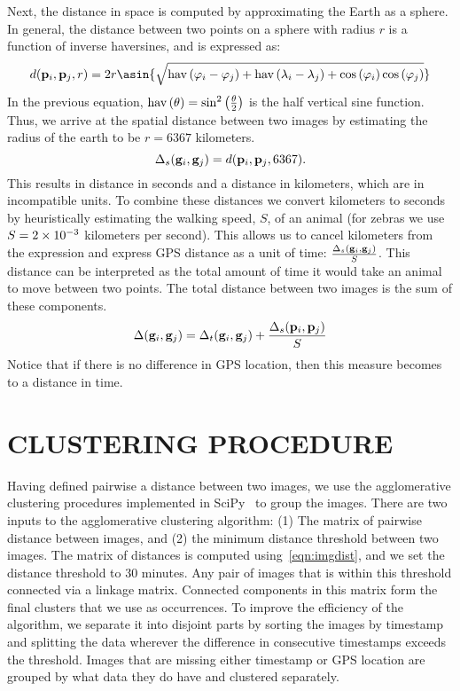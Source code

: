     Next, the distance in space is computed by approximating the Earth as a sphere.
    In general, the distance between two points on a sphere with radius $r$ is a function of inverse haversines,
      and is expressed as:
    \begin{equation}\label{eqn:geodistance}
        d(\gps_i, \gps_j, r) =
        2 r \asin{\sqrt{
            \haversine{\lat_i - \lat_j} +
            \haversine{\lon_i - \lon_j} +
            \cos\paren{\lat_i} \cos\paren{\lat_j}}}
    \end{equation}
    In the previous equation, $\mathbin{\operatorname{hav}}\left(\theta\right) = \sin^{2}\left(\frac{\theta}{2}\right)$ is the half vertical sine function.
    Thus, we arrive at the spatial distance between two images by estimating the radius of the earth to be
      $r=6367$ kilometers.
    \begin{equation}
        \Delta_s(\mathbf{g}_i, \mathbf{g}_j) = d(\mathbf{p}_i, \mathbf{p}_j, 6367).
    \end{equation}
    This results in distance in seconds and a distance in kilometers, which are in incompatible units.
    To combine these distances we convert kilometers to seconds by heuristically estimating the walking speed,
      $S$, of an animal (for zebras we use $S=2\times 10^{-3}$ kilometers per second).
    This allows us to cancel kilometers from the expression and express GPS distance as a unit of time:
    $\frac{\Delta_s(\mathbf{g}_i, \mathbf{g}_j)}{S}$.
    This distance can be interpreted as the total amount of time it would take an animal to move between two
      points.
    The total distance between two images is the sum of these components.
    \begin{equation}\label{eqn:imgdist}
        \Delta(\mathbf{g}_i, \mathbf{g}_j) = \Delta_t(\mathbf{g}_i, \mathbf{g}_j) + \frac{\Delta_s(\mathbf{p}_i, \mathbf{p}_j)}{S}
    \end{equation}
    Notice that if there is no difference in GPS location, then this measure
      becomes to a distance in time.

    \section{CLUSTERING PROCEDURE}
    Having defined pairwise a distance between two images, we use the agglomerative clustering procedures
      implemented in SciPy~\cite{eric_jones_scipy_2001} to group the images.
    There are two inputs to the agglomerative clustering algorithm:
    (1) The matrix of pairwise distance between images, and
    (2) the minimum distance threshold between two images.
    The matrix of distances is computed using~\cref{eqn:imgdist}, and we set the distance threshold to $30$
      minutes.
    Any pair of images that is within this threshold connected via a linkage matrix.
    Connected components in this matrix form the final clusters that we use as occurrences{}.
    To improve the efficiency of the algorithm, we separate it into disjoint parts by sorting the images by
      timestamp and splitting the data wherever the difference in consecutive timestamps exceeds the threshold.
    Images that are missing either timestamp or GPS location are grouped by what data they do have and clustered
      separately.

